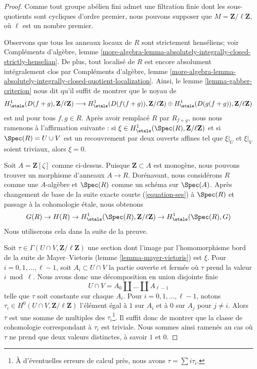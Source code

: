 \begin{proof}
Comme tout groupe abélien fini admet une filtration finie dont les
sous-quotients sont cycliques d'ordre premier, nous pouvons supposer
que $M = \mathbf{Z}/\ell\mathbf{Z}$, où $\ell$ est un nombre premier.

\medskip\noindent
Observons que tous les anneaux locaux de $R$ sont strictement henséliens; voir
Compléments d'algèbre, lemme
\ref{more-algebra-lemma-absolutely-integrally-closed-strictly-henselian}.
De plus, tout localisé de $R$ est encore absolument intégralement clos
par Compléments d'algèbre, lemme
\ref{more-algebra-lemma-absolutely-integrally-closed-quotient-localization}.
Ainsi, le lemme \ref{lemma-gabber-criterion} nous dit qu'il suffit de
montrer que le noyau de
$$
H^1_\etale(D(f + g), \mathbf{Z}/\ell\mathbf{Z})
\longrightarrow
H^1_\etale(D(f(f + g)), \mathbf{Z}/\ell\mathbf{Z}) \oplus
H^1_\etale(D(g(f + g)), \mathbf{Z}/\ell\mathbf{Z})
$$
est nul pour tous $f, g \in R$. Après avoir remplacé $R$ par $R_{f + g}$, nous
nous ramenons à l'affirmation suivante : si
$\xi \in H^1_\etale(\Spec(R), \mathbf{Z}/\ell\mathbf{Z})$
et si $\Spec(R) = U \cup V$ est un recouvrement par deux ouverts affines
tel que $\xi|_U$ et $\xi|_V$ soient triviaux, alors $\xi = 0$.

\medskip\noindent
Soit $A = \mathbf{Z}[\zeta]$ comme ci-dessus.
Puisque $\mathbf{Z} \subset A$ est monogène, nous pouvons trouver un morphisme
d'anneaux $A \to R$. Dorénavant, nous considérons $R$ comme une $A$-algèbre
et $\Spec(R)$ comme un schéma sur $\Spec(A)$.
Après changement de base de la suite exacte courte (\ref{equation-ses})
à $\Spec(R)$ et passage à la cohomologie étale, nous obtenons
$$
G(R) \to H(R) \to
H^1_\etale(\Spec(R), \mathbf{Z}/\ell\mathbf{Z}) \to
H^1_\etale(\Spec(R), G)
$$
Nous utiliserons cela dans la suite de la preuve.

\medskip\noindent
Soit $\tau \in \Gamma(U \cap V, \mathbf{Z}/\ell\mathbf{Z})$
une section dont l'image par l'homomorphisme bord de la suite de Mayer--Vietoris
(lemme \ref{lemma-mayer-vietoris}) est $\xi$.
Pour $i = 0, 1, \ldots, \ell - 1$, soit $A_i \subset U \cap V$
la partie ouverte et fermée où $\tau$ prend la valeur $i \bmod \ell$.
Nous avons donc une décomposition en union disjointe finie
$$
U \cap V = A_0 \amalg \ldots \amalg A_{\ell - 1}
$$
telle que $\tau$ soit constante sur chaque $A_i$. Pour
$i = 0, 1, \ldots, \ell - 1$, notons
$\tau_i \in H^0(U \cap V, \mathbf{Z}/\ell\mathbf{Z})$
l'élément égal à $1$ sur $A_i$ et
à $0$ sur $A_j$ pour $j \not = i$.
Alors $\tau$ est une somme de multiples des $\tau_i$\footnote{À d'éventuelles
erreurs de calcul près, nous avons $\tau = \sum i \tau_i$.}.
Il suffit donc de montrer que la classe de cohomologie correspondant
à $\tau_i$ est triviale. Nous sommes ainsi ramenés au cas où
$\tau$ ne prend que deux valeurs distinctes, à savoir $1$ et $0$.


\end{proof}
